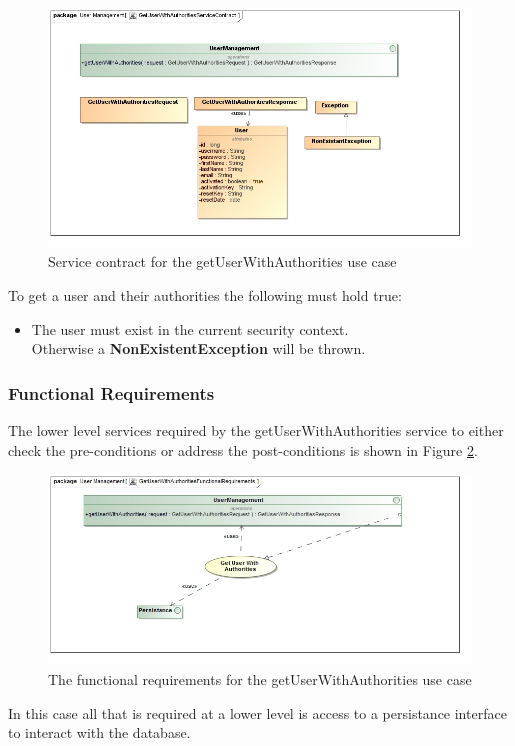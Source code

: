 \begin{figure}[H]
	\begin{center}
		\includegraphics[scale=0.55]{../Diagrams and Charts/Users/GetUserWithAuthoritiesServiceContract.jpg}
		\caption{Service contract for the getUserWithAuthorities use case}
		\label{fig:GetUserWithAuthoritiesServicesContract}
	\end{center}
\end{figure}

To get a user and their authorities the following must hold true:
\begin{itemize}
	\item The user must exist in the current security context.\\
	Otherwise a \textbf{NonExistentException} will be thrown.
\end{itemize}

\subsubsection{Functional Requirements}
The lower level services required by the getUserWithAuthorities service
to either check the pre-conditions or address the post-conditions is shown
in Figure \ref{fig:getUserWithAuthoritiesFR}.

\begin{figure}[H]
	\begin{center}
		\includegraphics[scale=0.5]{../Diagrams and Charts/Users/GetUserWithAuthoritiesFunctionalRequirements.jpg}
		\caption{The functional requirements for the getUserWithAuthorities use case}
		\label{fig:getUserWithAuthoritiesFR}
	\end{center}	
\end{figure}

In this case all that is required at a lower level is access to a persistance
interface to interact with the database.